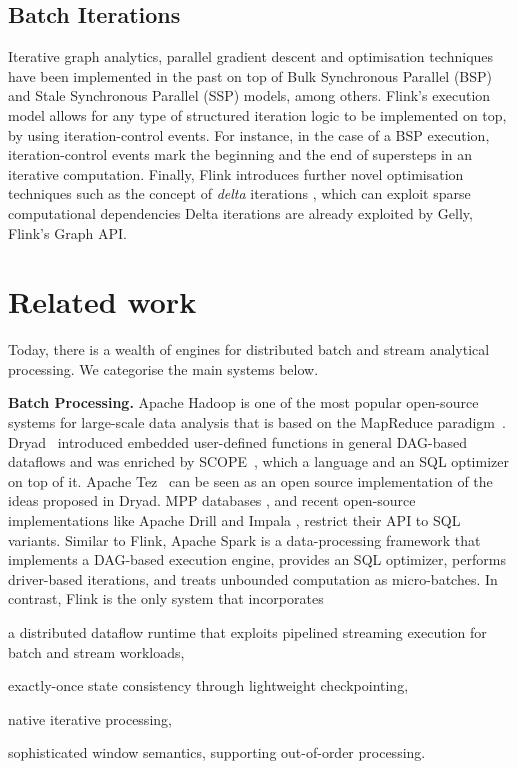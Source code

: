 \documentclass[11pt]{article}
\newcommand{\para}[1]{\vspace{2mm}\noindent\textbf{#1}}
\begin{document}
\subsection{Batch Iterations}
\label{sec:batch-iterations}
\vspace{-2mm}
Iterative graph analytics, parallel gradient descent and optimisation techniques have been implemented in the past on top of Bulk Synchronous Parallel (BSP) and Stale Synchronous Parallel (SSP) models, among others. Flink's execution model allows for any type of structured iteration logic to be implemented on top, by using iteration-control events. For instance, in the case of a BSP execution, iteration-control events mark the beginning and the end of supersteps in an iterative computation. Finally, Flink introduces further novel optimisation techniques such as the concept of \emph{delta} iterations \cite{DBLP:journals/pvldb/EwenTKM12}, which can exploit sparse computational dependencies Delta iterations are already exploited by Gelly, Flink's Graph API.  

\section{Related work}
\vspace{-2mm}
\label{sec:related}
Today, there is a wealth of engines for distributed batch and stream analytical processing. We categorise the main systems below. 

\para{Batch Processing.} Apache Hadoop is one of the most popular open-source systems for large-scale data analysis that is based on the MapReduce paradigm~\cite{DBLP:journals/cacm/DeanG08}. Dryad~\cite{isard2007dryad} introduced embedded user-defined functions in general DAG-based dataflows and was enriched by SCOPE~\cite{scopeOptimizer}, which a language and an SQL optimizer on top of it. Apache Tez~\cite{saha2015apache} can be seen as an open source implementation of the ideas proposed in Dryad. MPP databases \cite{dewitt1990gamma}, and recent open-source implementations like Apache Drill and Impala \cite{kornacker2015impala}, restrict their API to SQL variants. Similar to Flink, Apache Spark \cite{DBLP:conf/hotcloud/ZahariaCFSS10} is a data-processing framework that implements a DAG-based execution engine, provides an SQL optimizer, performs driver-based iterations, and treats unbounded computation as micro-batches. In contrast, Flink is the only system that incorporates
\begin{inparaenum}[i)]
  \item a distributed dataflow runtime that exploits pipelined streaming execution for batch and stream workloads,
  \item exactly-once state consistency through lightweight checkpointing,
  \item native iterative processing,
  \item sophisticated window semantics, supporting out-of-order processing.
\end{inparaenum}
\end{document}
